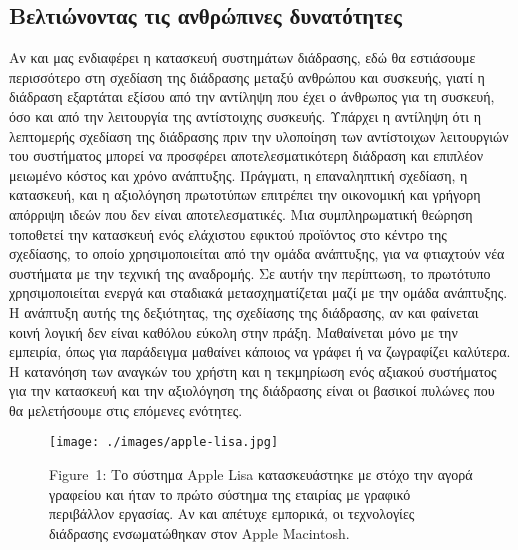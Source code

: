 \documentclass[
]{article}
\begin{document}
\hypertarget{ux3b2ux3b5ux3bbux3c4ux3b9ux3ceux3bdux3bfux3bdux3c4ux3b1ux3c2-ux3c4ux3b9ux3c2-ux3b1ux3bdux3b8ux3c1ux3ceux3c0ux3b9ux3bdux3b5ux3c2-ux3b4ux3c5ux3bdux3b1ux3c4ux3ccux3c4ux3b7ux3c4ux3b5ux3c2}{%
\subsection{Βελτιώνοντας τις ανθρώπινες
δυνατότητες}\label{ux3b2ux3b5ux3bbux3c4ux3b9ux3ceux3bdux3bfux3bdux3c4ux3b1ux3c2-ux3c4ux3b9ux3c2-ux3b1ux3bdux3b8ux3c1ux3ceux3c0ux3b9ux3bdux3b5ux3c2-ux3b4ux3c5ux3bdux3b1ux3c4ux3ccux3c4ux3b7ux3c4ux3b5ux3c2}}

Αν και μας ενδιαφέρει η κατασκευή συστημάτων διάδρασης, εδώ θα
εστιάσουμε περισσότερο στη σχεδίαση της διάδρασης μεταξύ ανθρώπου και
συσκευής, γιατί η διάδραση εξαρτάται εξίσου από την αντίληψη που έχει ο
άνθρωπος για τη συσκευή, όσο και από την λειτουργία της αντίστοιχης
συσκευής. Υπάρχει η αντίληψη ότι η λεπτομερής σχεδίαση της διάδρασης
πριν την υλοποίηση των αντίστοιχων λειτουργιών του συστήματος μπορεί να
προσφέρει αποτελεσματικότερη διάδραση και επιπλέον μειωμένο κόστος και
χρόνο ανάπτυξης. Πράγματι, η επαναληπτική σχεδίαση, η κατασκευή, και η
αξιολόγηση πρωτοτύπων επιτρέπει την οικονομική και γρήγορη απόρριψη
ιδεών που δεν είναι αποτελεσματικές. Μια συμπληρωματική θεώρηση
τοποθετεί την κατασκευή ενός ελάχιστου εφικτού προϊόντος στο κέντρο της
σχεδίασης, το οποίο χρησιμοποιείται από την ομάδα ανάπτυξης, για να
φτιαχτούν νέα συστήματα με την τεχνική της αναδρομής. Σε αυτήν την
περίπτωση, το πρωτότυπο χρησιμοποιείται ενεργά και σταδιακά
μετασχηματίζεται μαζί με την ομάδα ανάπτυξης. Η ανάπτυξη αυτής της
δεξιότητας, της σχεδίασης της διάδρασης, αν και φαίνεται κοινή λογική
δεν είναι καθόλου εύκολη στην πράξη. Μαθαίνεται μόνο με την εμπειρία,
όπως για παράδειγμα μαθαίνει κάποιος να γράφει ή να ζωγραφίζει καλύτερα.
Η κατανόηση των αναγκών του χρήστη και η τεκμηρίωση ενός αξιακού
συστήματος για την κατασκευή και την αξιολόγηση της διάδρασης είναι οι
βασικοί πυλώνες που θα μελετήσουμε στις επόμενες ενότητες.

\leavevmode{}%
\begin{figure}
\hypertarget{fig:apple-lisa}{%
\centering
\texttt{[image: ./images/apple-lisa.jpg]}
\caption{Figure~1: Το σύστημα Apple Lisa κατασκευάστηκε με στόχο την
αγορά γραφείου και ήταν το πρώτο σύστημα της εταιρίας με γραφικό
περιβάλλον εργασίας. Αν και απέτυχε εμπορικά, οι τεχνολογίες διάδρασης
ενσωματώθηκαν στον Apple Macintosh.}\label{fig:apple-lisa}
}
\end{figure}
\end{document}
